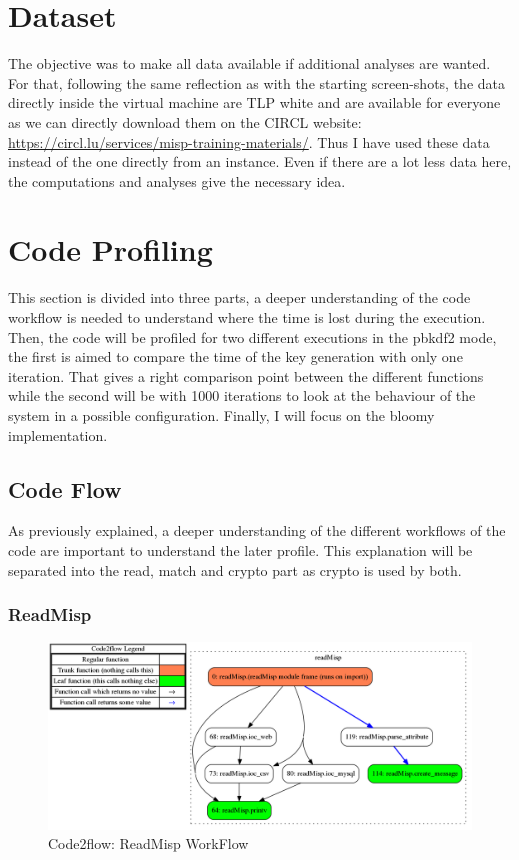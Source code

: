 \documentclass{eplmastersthesis}
\begin{document}
\section{Dataset}
The objective was to make all data available if additional analyses are wanted. For that, following the same reflection as with the starting screen-shots, the data directly inside the virtual machine are TLP white and are available for everyone as we can directly download them on the CIRCL website: \url{https://circl.lu/services/misp-training-materials/}.
Thus I have used these data instead of the one directly from an instance. Even if there are a lot less data here, the computations and analyses give the necessary idea.

\section{Code Profiling}
This section is divided into three parts, a deeper understanding of the code workflow is needed to understand where the time is lost during the execution. Then, the code will be profiled for two different executions in the \gls{pbkdf2} mode, the first is aimed to compare the time of the key generation with only one iteration. That gives a right comparison point between the different functions while the second will be with 1000 iterations to look at the behaviour of the system in a possible configuration. 
Finally, I will focus on the bloomy implementation.

\subsection{Code Flow}
As previously explained, a deeper understanding of the different workflows of the code are important to understand the later profile.
This explanation will be separated into the read, match and crypto part as crypto is used by both.

\subsubsection{ReadMisp}
\begin{figure}[h!]
\begin{center}
	\includegraphics[scale=0.3]{res/flowReadMisp}
	\caption{Code2flow: ReadMisp WorkFlow}
	\label{code2flow-readMisp}
\end{center}
\end{figure}
\end{document}
